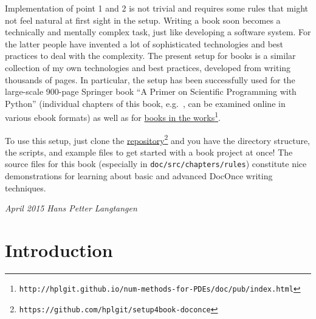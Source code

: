 \documentclass[graybox,envcountchap,sectrefs,final]{svmonodo}
\begin{document}
Implementation of point 1 and 2 is not trivial and requires some rules
that might not feel natural at first sight in the setup.  Writing a
book soon becomes a technically and mentally complex task, just like
developing a software system. For the latter people have invented a
lot of sophisticated technologies and best practices to deal with the
complexity. The present setup for books is a similar collection of my
own technologies and best practices, developed from writing
thousands of pages. In particular, the setup has been successfully
used for the large-scale 900-page Springer book ``A Primer on
Scientific Programming with Python'' \cite{Langtangen_2014} (individual
chapters of this book, e.g.~\cite{Langtangen_TCSE6_looplist}, can be
examined online in various ebook formats) as well as for
\href{{http://hplgit.github.io/num-methods-for-PDEs/doc/pub/index.html}}{books in the works}\footnote{\texttt{http://hplgit.github.io/num-methods-for-PDEs/doc/pub/index.html}}.

To use this setup, just clone the \href{{https://github.com/hplgit/setup4book-doconce}}{repository}\footnote{\texttt{https://github.com/hplgit/setup4book-doconce}} and you have the
directory structure, the scripts, and example files to get started with
a book project at
once! The source files for this book (especially in
\texttt{doc/src/chapters/rules}) constitute nice demonstrations for learning
about basic and advanced DocOnce writing techniques.



\vspace{3mm}




\vspace{3mm}




\vspace{3mm}




\vspace{3mm}



\noindent
{\it April 2015}  \hfill  {\it Hans Petter Langtangen}



\tableofcontents


\vspace{1cm} %

\mainmatter




\chapter{Introduction}
\label{ch:intro}
\end{document}
